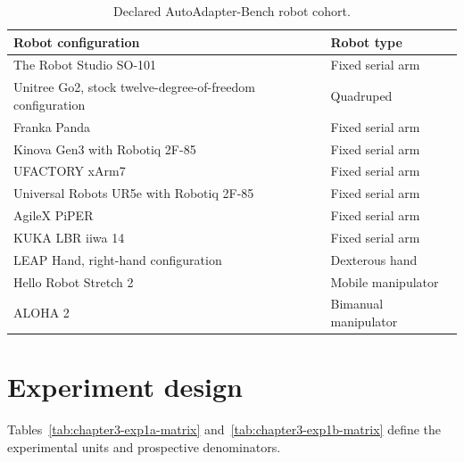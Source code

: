 \begin{table}[htbp]
  \centering
  \begingroup
  \small
  \renewcommand{\arraystretch}{1.08}
  \caption{Declared AutoAdapter-Bench robot cohort.}
  \label{tab:chapter3-robot-cohort}
  \begin{tabularx}{\textwidth}{@{}>{\raggedright\arraybackslash}p{92mm}X@{}}
    \toprule
    \textbf{Robot configuration} & \textbf{Robot type} \\
    \midrule
    The Robot Studio SO-101 & Fixed serial arm \\
    Unitree Go2, stock twelve-degree-of-freedom configuration & Quadruped \\
    Franka Panda & Fixed serial arm \\
    Kinova Gen3 with Robotiq 2F-85 & Fixed serial arm \\
    UFACTORY xArm7 & Fixed serial arm \\
    Universal Robots UR5e with Robotiq 2F-85 & Fixed serial arm \\
    AgileX PiPER & Fixed serial arm \\
    KUKA LBR iiwa 14 & Fixed serial arm \\
    LEAP Hand, right-hand configuration & Dexterous hand \\
    Hello Robot Stretch 2 & Mobile manipulator \\
    ALOHA 2 & Bimanual manipulator \\
    \bottomrule
  \end{tabularx}
  \endgroup
\end{table}



\section[Experiment design]{Experiment design}

Tables~\ref{tab:chapter3-exp1a-matrix} and~\ref{tab:chapter3-exp1b-matrix} define the
experimental units and prospective denominators.


